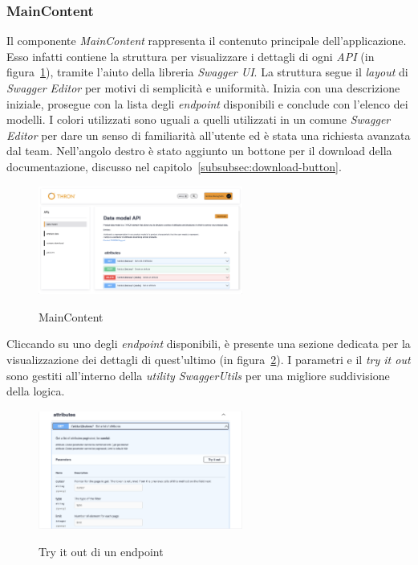 \subsubsection{MainContent}\label{subsubsec:main-content}
Il componente \textit{MainContent} rappresenta il contenuto principale dell'applicazione. Esso infatti contiene la struttura per visualizzare i dettagli di ogni \textit{API} (in figura~\ref{fig:main-content}), tramite l'aiuto 
della libreria \textit{Swagger UI}.
La struttura segue il \textit{layout} di \textit{Swagger Editor} per motivi di semplicità e uniformità. Inizia con una descrizione iniziale, prosegue con la lista degli \textit{endpoint} disponibili e conclude con l'elenco dei modelli.
I colori utilizzati sono uguali a quelli utilizzati in un comune \textit{Swagger Editor} per dare un senso di familiarità all'utente ed è stata una richiesta avanzata dal team.
Nell'angolo destro è stato aggiunto un bottone per il download della documentazione, discusso nel capitolo~\ref{subsubsec:download-button}.
\begin{figure}[ht]
  \centering
  \includegraphics[width=0.6\textwidth, alt={Sezione per la visualizzazione dei dettagli di un API}]{images/frontend/DataModelView.jpg}
  \caption{MainContent}\label{fig:main-content}
\end{figure}
\pagebreak

Cliccando su uno degli \textit{endpoint} disponibili, è presente una sezione dedicata per la visualizzazione dei dettagli di quest'ultimo (in figura~\ref{fig:try-it-out}).
I parametri e il \textit{try it out} sono gestiti all'interno della \textit{utility SwaggerUtils} per una migliore suddivisione della logica.

\begin{figure}[ht]
  \centering
  \includegraphics[width=0.6\textwidth, alt={Sezione try it out di un endpoint}]{images/frontend/TryItOut.jpg}
  \caption{Try it out di un endpoint}\label{fig:try-it-out}
\end{figure}

